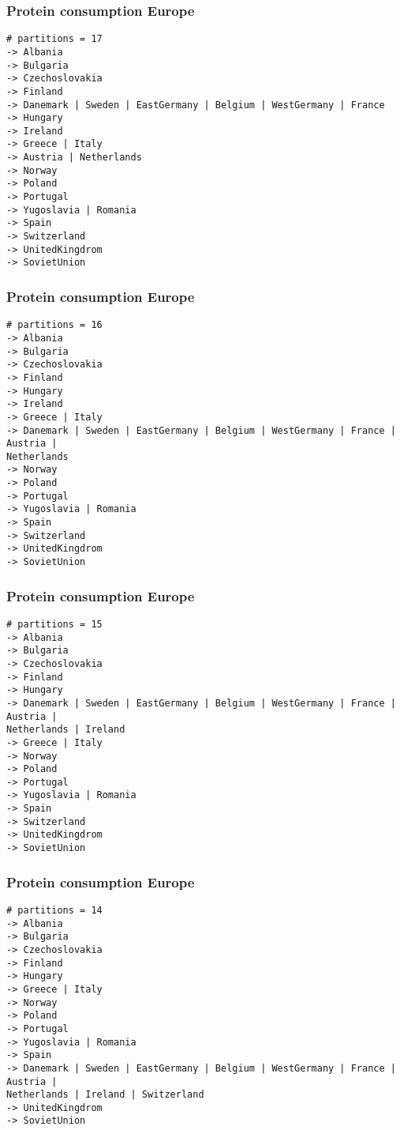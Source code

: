 \begin{frame}[fragile, t]
\frametitle{Protein consumption Europe \hyperlink{last-aliments<1>}{}}
\scriptsize
\begin{verbatim}
# partitions = 17
-> Albania
-> Bulgaria
-> Czechoslovakia
-> Finland
-> Danemark | Sweden | EastGermany | Belgium | WestGermany | France
-> Hungary
-> Ireland
-> Greece | Italy
-> Austria | Netherlands
-> Norway
-> Poland
-> Portugal
-> Yugoslavia | Romania
-> Spain
-> Switzerland
-> UnitedKingdrom
-> SovietUnion
\end{verbatim}

\end{frame}
\begin{frame}[fragile, t]
\frametitle{Protein consumption Europe \hyperlink{last-aliments<1>}{}}
\scriptsize
\begin{verbatim}
# partitions = 16
-> Albania
-> Bulgaria
-> Czechoslovakia
-> Finland
-> Hungary
-> Ireland
-> Greece | Italy
-> Danemark | Sweden | EastGermany | Belgium | WestGermany | France | Austria | 
Netherlands
-> Norway
-> Poland
-> Portugal
-> Yugoslavia | Romania
-> Spain
-> Switzerland
-> UnitedKingdrom
-> SovietUnion
\end{verbatim}

\end{frame}
\begin{frame}[fragile, t]
\frametitle{Protein consumption Europe \hyperlink{last-aliments<1>}{}}
\scriptsize
\begin{verbatim}
# partitions = 15
-> Albania
-> Bulgaria
-> Czechoslovakia
-> Finland
-> Hungary
-> Danemark | Sweden | EastGermany | Belgium | WestGermany | France | Austria | 
Netherlands | Ireland
-> Greece | Italy
-> Norway
-> Poland
-> Portugal
-> Yugoslavia | Romania
-> Spain
-> Switzerland
-> UnitedKingdrom
-> SovietUnion
\end{verbatim}

\end{frame}
\begin{frame}[fragile, t]
\frametitle{Protein consumption Europe \hyperlink{last-aliments<1>}{}}
\scriptsize
\begin{verbatim}
# partitions = 14
-> Albania
-> Bulgaria
-> Czechoslovakia
-> Finland
-> Hungary
-> Greece | Italy
-> Norway
-> Poland
-> Portugal
-> Yugoslavia | Romania
-> Spain
-> Danemark | Sweden | EastGermany | Belgium | WestGermany | France | Austria | 
Netherlands | Ireland | Switzerland
-> UnitedKingdrom
-> SovietUnion
\end{verbatim}

\end{frame}
